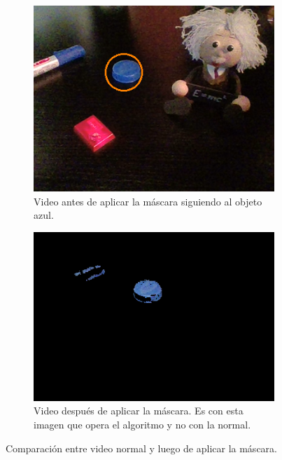 \begin{figure}[]
\centering
	\begin{subfigure}{.4\textwidth}
		\centering
		\includegraphics[width=\textwidth]{Imagenes/color1.png}
		\caption{Video antes de aplicar la máscara siguiendo al objeto azul.}
		\label{fig:col1}
	\end{subfigure}
	\begin{subfigure}{.4\textwidth}
		\centering
		\includegraphics[width=\textwidth]{Imagenes/color2.png}
		\caption{Video después de aplicar la máscara. Es con esta imagen que opera el algoritmo y no con la normal.}
		\label{fig:col2}
	\end{subfigure}
	\caption{Comparación entre video normal y luego de aplicar la máscara.}
	\label{fig:color_comp}
\end{figure}

